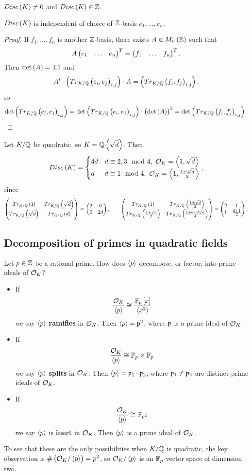 \begin{remark*}
$ Disc\br{K} \ne 0 $ and $ Disc\br{K} \in \Z $.
\end{remark*}

\begin{lemma}
$ Disc\br{K} $ is independent of choice of $ \mathbb{Z} $-basis $ e_1, \dots, e_n $.
\end{lemma}

\begin{proof}
If $ f_1, \dots, f_n $ is another $ \mathbb{Z} $-basis, there exists $ A \in M_n\br{\Z} $ such that
$$ A\onebythree{e_1}{\dots}{e_n}^T = \onebythree{f_1}{\dots}{f_n}^T. $$
Then $ \det\br{A} = \pm 1 $ and
$$ A^t \cdot \br{Tr_{K / \Q}\br{e_i, e_j}_{i, j}} \cdot A = \br{Tr_{K / \Q}\br{f_i, f_j}_{i, j}}, $$
so
$$ \det\br{Tr_{K / \Q}\br{e_i, e_j}_{i, j}} = \det\br{Tr_{K / \Q}\br{e_i, e_j}_{i, j}} \cdot \br{\det\br{A}}^2 = \det\br{Tr_{K / \Q}\br{f_i, f_j}_{i, j}}. $$
\end{proof}

\begin{example*}
Let $ K / \mathbb{Q} $ be quadratic, so $ K = \Q\br{\sqrt{d}} $. Then
$$ Disc\br{K} =
\begin{cases}
4d & d \equiv 2, 3 \mod 4, \ \OO_K = \abr{1, \sqrt{d}} \\
d & d \equiv 1 \mod 4, \ \OO_K = \abr{1, \tfrac{1 + \sqrt{d}}{2}}
\end{cases},
$$
since
$$ \twobytwo{Tr_{K / \Q}\br{1}}{Tr_{K / \Q}\br{\sqrt{d}}}{Tr_{K / \Q}\br{\sqrt{d}}}{Tr_{K / \Q}\br{d}} = \twobytwo{2}{0}{0}{2d}, \qquad \twobytwo{Tr_{K / \Q}\br{1}}{Tr_{K / \Q}\br{\tfrac{1 + \sqrt{d}}{2}}}{Tr_{K / \Q}\br{\tfrac{1 + \sqrt{d}}{2}}}{Tr_{K / \Q}\br{\tfrac{1 + d + 2\sqrt{d}}{4}}} = \twobytwo{2}{1}{1}{\tfrac{d + 1}{2}}. $$
\end{example*}

\pagebreak

\subsection{Decomposition of primes in quadratic fields}

Let $ p \in \mathbb{Z} $ be a rational prime. How does $ \left\langle p \right\rangle $ decompose, or factor, into prime ideals of $ \mathcal{O}_K $?
\begin{itemize}
\item If
$$ \dfrac{\OO_K}{\abr{p}} \cong \dfrac{\F_p\sbr{x}}{\abr{x^2}} $$
we say $ \left\langle p \right\rangle $ \textbf{ramifies} in $ \mathcal{O}_K $. Then $ \left\langle p \right\rangle = \mathfrak{p}^2 $, where $ \mathfrak{p} $ is a prime ideal of $ \mathcal{O}_K $.
\item If
$$ \dfrac{\mathcal{O}_K}{\left\langle p \right\rangle} \cong \mathbb{F}_p \times \mathbb{F}_p $$
we say $ \left\langle p \right\rangle $ \textbf{splits} in $ \mathcal{O}_K $. Then $ \left\langle p \right\rangle = \mathfrak{p}_1 \cdot \mathfrak{p}_2 $, where $ \mathfrak{p}_1 \ne \mathfrak{p}_2 $ are distinct prime ideals of $ \mathcal{O}_K $.
\item If
$$ \dfrac{\mathcal{O}_K}{\left\langle p \right\rangle} \cong \mathbb{F}_{p^2} $$
we say $ \left\langle p \right\rangle $ is \textbf{inert} in $ \mathcal{O}_K $. Then $ \left\langle p \right\rangle $ is a prime ideal of $ \mathcal{O}_K $.
\end{itemize}
To see that these are the only possibilities when $ K / \mathbb{Q} $ is quadratic, the key observation is $ \#\br{\OO_K / \abr{p}} = p^2 $, so $ \mathcal{O}_K / \left\langle p \right\rangle $ is an $ \mathbb{F}_p $-vector space of dimension two.

